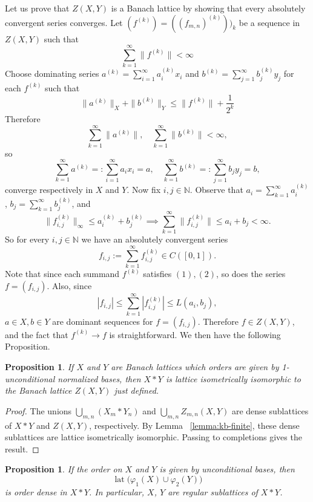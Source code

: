 \documentclass[12pt]{amsart}
\DeclareMathOperator{\lat}{lat}
\theoremstyle{plain}
\newtheorem{proposition}[theorem]{Proposition}
\theoremstyle{definition}
\begin{document}
Let us prove that $Z(X,Y)$ is a Banach lattice by showing that every absolutely convergent series converges. Let $(f^{(k)})=((f_{m,n})^{(k)}))_k$ be a sequence in $Z(X,Y)$ such that \[
\sum_{k=1}^\infty\|f^{(k)}\|<\infty
\]  Choose dominating series $a^{(k)}=\sum_{i=1}^\infty a_i^{(k)}x_i$ and $b^{(k)}=\sum_{j=1}^\infty b_j^{(k)}y_j$ for each $f^{(k)}$ such that
\[
\|a^{(k)}\|_X+\|b^{(k)}\|_Y\leq\|f^{(k)}\|+\frac{1}{2^k}
\]
Therefore
\[
\sum_{k=1}^\infty \|a^{(k)}\|,\quad\sum_{k=1}^\infty \|b^{(k)}\|<\infty,
\]
so
\[
\sum_{k=1}^\infty a^{(k)}=:\sum_{i=1}^\infty a_ix_i=a,\quad \sum_{k=1}^\infty b^{(k)}=:\sum_{j=1}^\infty b_jy_j=b,
\]
converge respectively in $X$ and $Y$. Now fix $i,j\in \mathbb N$. Observe that $a_i=\sum_{k=1}^\infty a_i^{(k)}$, $b_j=\sum_{k=1}^\infty b_j^{(k)}$, and \[
\|f_{i,j}^{(k)}\|_\infty\leq a_i^{(k)}+b_j^{(k)}\implies\sum_{k=1}^\infty \|f_{i,j}^{(k)}\|\leq a_i+b_j<\infty.
\]
So for every $i,j\in\mathbb N$ we have an absolutely convergent series
\[
f_{i,j}:=\sum_{k=1}^\infty f_{i,j}^{(k)}\in C([0,1]).
\]
Note that since each summand $f^{(k)}$ satisfies $(1),(2)$, so does the series $f=(f_{i,j})$. Also, since 
\[
|f_{i,j}|\leq \sum_{k=1}^\infty|f_{i,j}^{(k)}|\leq L(a_i,b_j),
\]
 $a\in X,b\in Y$ are dominant sequences for $f=(f_{i,j})$. Therefore $f\in Z(X,Y)$, and the fact that $f^{(k)}\to f$ is straightforward. We then have the following Proposition.





\begin{proposition}\label{prop:seqfreeprod}
If $X$ and $Y$ are Banach lattices which orders are given by 1-unconditional normalized bases, then $X\ast Y$ is lattice isometrically isomorphic to the Banach lattice $Z(X,Y)$ just defined.
\end{proposition}

\begin{proof}
The unions $\bigcup_{m,n}(X_m\ast Y_n)$ and $\bigcup_{m,n}Z_{m,n}(X,Y)$ are dense sublattices of $X\ast Y$ and $Z(X,Y)$, respectively. By Lemma ~\ref{lemma:kb-finite}, these dense sublattices are lattice isometrically isomorphic. Passing to completions gives the result.
\end{proof}

\begin{proposition}\label{prop:order-dense-unconditional}
If the order on $X$ and $Y$ is given by unconditional bases, then
\[
\lat\bigl(\varphi_1(X)\cup \varphi_2(Y)\bigr)
\]
is order dense in $X\ast Y$. In particular, $X$, $Y$ are regular sublattices of $X\ast Y$.
\end{proposition}
\end{document}
